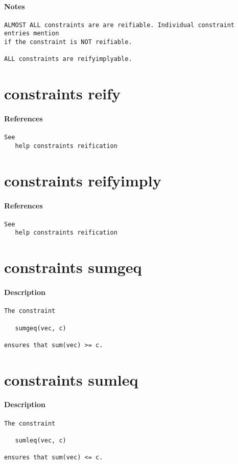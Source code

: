 \paragraph{Notes}
{\footnotesize
\begin{verbatim}
ALMOST ALL constraints are are reifiable. Individual constraint entries mention
if the constraint is NOT reifiable.

ALL constraints are reifyimplyable.
\end{verbatim}
}
\section{constraints reify}
\paragraph{References}
{\footnotesize
\begin{verbatim}
See
   help constraints reification
\end{verbatim}
}
\section{constraints reifyimply}
\paragraph{References}
{\footnotesize
\begin{verbatim}
See
   help constraints reification
\end{verbatim}
}
\section{constraints sumgeq}
\paragraph{Description}
{\footnotesize
\begin{verbatim}
The constraint

   sumgeq(vec, c)

ensures that sum(vec) >= c.
\end{verbatim}
}
\section{constraints sumleq}
\paragraph{Description}
{\footnotesize
\begin{verbatim}
The constraint

   sumleq(vec, c)

ensures that sum(vec) <= c.
\end{verbatim}
}
